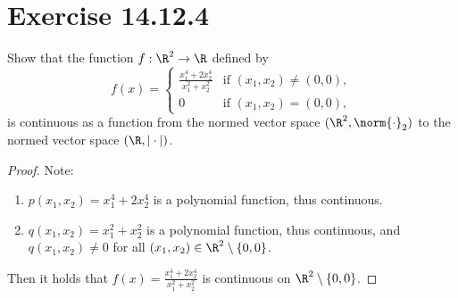 \documentclass{assignment}
\begin{document}
\section{Exercise 14.12.4}
\begin{problem}
    Show that the function $f: \R^2 \to \R$ defined by
    $$f(x) = \begin{cases}
        \frac{x_1^4+2x_2^4}{x_1^2+x_2^2} & \text{if } (x_1,x_2) \neq (0,0), \\
        0 & \text{if } (x_1,x_2) = (0,0),
    \end{cases}$$
    is continuous as a function from the normed vector space $(\R^2,\norm{\cdot}_2)$ to the normed vector space $(\R,|\cdot|)$.
\end{problem}
\begin{proof}
    Note:
    \begin{enumerate}
        \item $p(x_1,x_2) = x_1^4+2x_2^4$ is a polynomial function, thus continuous.
        \item $q(x_1,x_2) = x_1^2+x_2^2$ is a polynomial function, thus continuous, and $q(x_1,x_2) \ne 0$ for all $(x_1,x_2) \in \R^2\setminus\{0,0\}$.
    \end{enumerate}
    Then it holds that $f(x) = \frac{x_1^4+2x_2^4}{x_1^2+x_2^2}$ is continuous on $\R^2 \setminus \{0,0\}$.


\end{proof}
\end{document}

